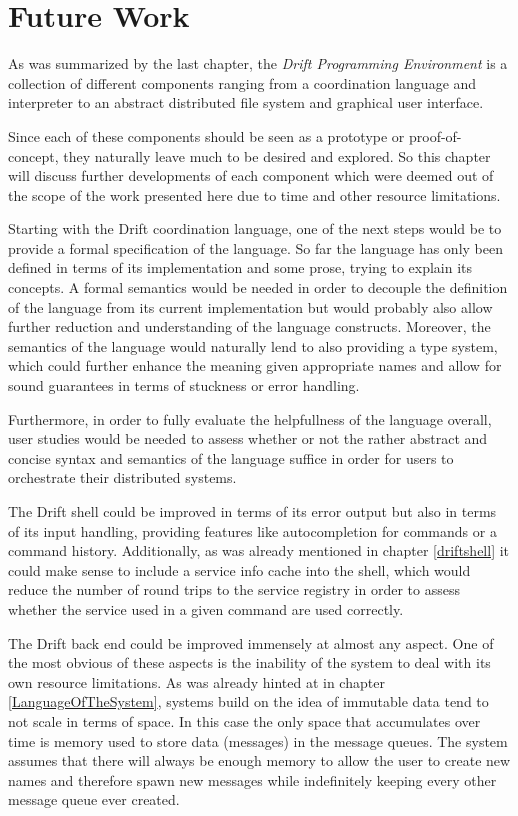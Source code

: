 \section{Future Work}
\label{futurework}

As was summarized by the last chapter, the
\textit{Drift Programming Environment} is a collection of different
components ranging from a coordination language and interpreter
to an abstract distributed file system and graphical user interface.

Since each of these components should be seen as a prototype
or proof-of-concept, they naturally leave much to be desired and
explored. So this chapter will discuss further developments of
each component which were deemed out of the scope of the work
presented here due to time and other resource limitations.
\newline

Starting with the Drift coordination language, one of the next
steps would be to provide a formal specification of the language.
So far the language has only been defined in terms of its implementation
and some prose, trying to explain its concepts. A formal semantics
would be needed in order to decouple the definition of the language
from its current implementation but would probably also allow
further reduction and understanding of the language constructs.
Moreover, the semantics of the language would naturally lend to
also providing a type system, which could further enhance the
meaning given appropriate names and allow for sound guarantees
in terms of stuckness or error handling.

Furthermore, in order to fully evaluate the helpfullness of the
language overall, user studies would be needed to assess whether
or not the rather abstract and concise syntax and semantics of
the language suffice in order for users to orchestrate their
distributed systems.

The Drift shell could be improved in terms of its error output
but also in terms of its input handling, providing features
like autocompletion for commands or a command history. Additionally,
as was already mentioned in chapter \ref{driftshell} it could make
sense to include a service info cache into the shell, which would
reduce the number of round trips to the service registry in order
to assess whether the service used in a given command are used
correctly.
\newline

The Drift back end could be improved immensely at almost any
aspect. One of the most obvious of these aspects is the inability
of the system to deal with its own resource limitations. As was
already hinted at in chapter \ref{LanguageOfTheSystem}, systems
build on the idea of immutable data tend to not scale in terms of
space. In this case the only space that accumulates over time
is memory used to store data (messages) in the message queues.
The system assumes that there will always be enough memory to
allow the user to create new names and therefore spawn new
messages while indefinitely keeping every other message queue
ever created.

